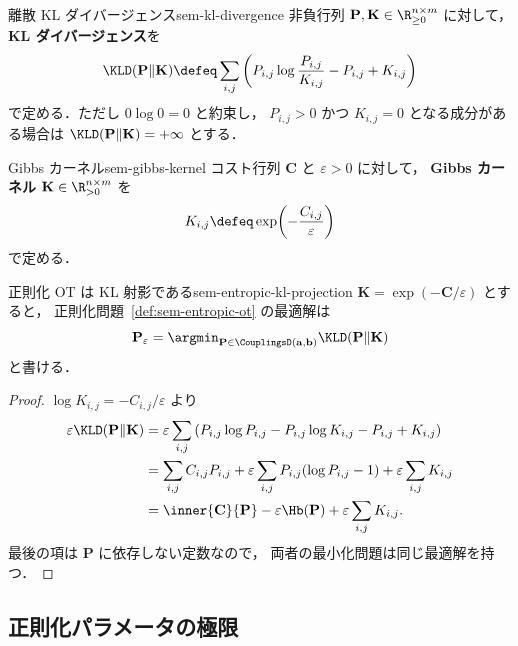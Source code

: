 \begin{definition}{離散 KL ダイバージェンス}{sem-kl-divergence}
  非負行列 $\mathbf{P}, \mathbf{K} \in \R_{\geq 0}^{n \times m}$ に対して，
  \textbf{KL ダイバージェンス}を
  \[
    \KLD(\mathbf{P} \| \mathbf{K})
    \defeq
    \sum_{i,j}
    \left(
      P_{i,j}\log\frac{P_{i,j}}{K_{i,j}}
      - P_{i,j} + K_{i,j}
    \right)
  \]
  で定める．ただし $0\log 0 = 0$ と約束し，
  $P_{i,j} > 0$ かつ $K_{i,j}=0$ となる成分がある場合は
  $\KLD(\mathbf{P}\|\mathbf{K}) = +\infty$ とする．
\end{definition}

\begin{definition}{Gibbs カーネル}{sem-gibbs-kernel}
  コスト行列 $\mathbf{C}$ と $\varepsilon > 0$ に対して，
  \textbf{Gibbs カーネル} $\mathbf{K} \in \R_{>0}^{n \times m}$ を
  \[
    K_{i,j} \defeq \exp\!\left(-\frac{C_{i,j}}{\varepsilon}\right)
  \]
  で定める．
\end{definition}

\begin{proposition}{正則化 OT は KL 射影である}{sem-entropic-kl-projection}
  $\mathbf{K} = \exp(-\mathbf{C}/\varepsilon)$ とすると，
  正則化問題~\ref{def:sem-entropic-ot} の最適解は
  \[
    \mathbf{P}_\varepsilon
    =
    \argmin_{\mathbf{P} \in \CouplingsD(\mathbf{a}, \mathbf{b})}
    \KLD(\mathbf{P}\|\mathbf{K})
  \]
  と書ける．
\end{proposition}

\begin{proof}
  $\log K_{i,j} = -C_{i,j}/\varepsilon$ より
  \begin{align*}
    \varepsilon \KLD(\mathbf{P}\|\mathbf{K})
    &=
    \varepsilon\sum_{i,j}
    \left(
      P_{i,j}\log P_{i,j}
      - P_{i,j}\log K_{i,j}
      - P_{i,j}
      + K_{i,j}
    \right) \\
    &=
    \sum_{i,j} C_{i,j}P_{i,j}
    + \varepsilon\sum_{i,j} P_{i,j}(\log P_{i,j}-1)
    + \varepsilon\sum_{i,j} K_{i,j} \\
    &=
    \inner{\mathbf{C}}{\mathbf{P}} - \varepsilon \Hb(\mathbf{P})
    + \varepsilon\sum_{i,j} K_{i,j}.
  \end{align*}
  最後の項は $\mathbf{P}$ に依存しない定数なので，
  両者の最小化問題は同じ最適解を持つ．
\end{proof}

\subsection{正則化パラメータの極限}
\label{subsec:sem-epsilon-limits}

